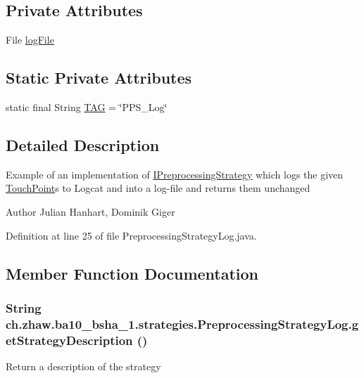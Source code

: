 \subsection*{Private Attributes}
\begin{DoxyCompactItemize}
\item 
File \hyperlink{classch_1_1zhaw_1_1ba10__bsha__1_1_1strategies_1_1PreprocessingStrategyLog_a369993f5c6a751d5915b0afceaf930b5}{logFile}
\end{DoxyCompactItemize}
\subsection*{Static Private Attributes}
\begin{DoxyCompactItemize}
\item 
static final String \hyperlink{classch_1_1zhaw_1_1ba10__bsha__1_1_1strategies_1_1PreprocessingStrategyLog_acb9148bfbd411f6bfae3ac2c6921925d}{TAG} = \char`\"{}PPS\_\-Log\char`\"{}
\end{DoxyCompactItemize}


\subsection{Detailed Description}
Example of an implementation of \hyperlink{interfacech_1_1zhaw_1_1ba10__bsha__1_1_1strategies_1_1IPreprocessingStrategy}{IPreprocessingStrategy} which logs the given \hyperlink{classch_1_1zhaw_1_1ba10__bsha__1_1_1TouchPoint}{TouchPoint}s to Logcat and into a log-\/file and returns them unchanged

\begin{DoxyAuthor}{Author}
Julian Hanhart, Dominik Giger 
\end{DoxyAuthor}


Definition at line 25 of file PreprocessingStrategyLog.java.

\subsection{Member Function Documentation}
\hypertarget{classch_1_1zhaw_1_1ba10__bsha__1_1_1strategies_1_1PreprocessingStrategyLog_a9dc4e3fe302e8e318c68e3f2257a8979}{
\subsubsection[{getStrategyDescription}]{\setlength{\rightskip}{0pt plus 5cm}String ch.zhaw.ba10\_\-bsha\_\-1.strategies.PreprocessingStrategyLog.getStrategyDescription ()}}
\label{classch_1_1zhaw_1_1ba10__bsha__1_1_1strategies_1_1PreprocessingStrategyLog_a9dc4e3fe302e8e318c68e3f2257a8979}
Return a description of the strategy

